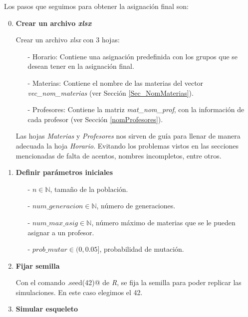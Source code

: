 Los pasos que seguimos para obtener la asignación final son:

\begin{enumerate}
\setcounter{enumi}{-1}
\item \textbf{Crear un archivo \textit{xlsx}} \label{paso_cero}

Crear un archivo \textit{xlsx} con 3 hojas:

\begin{itemize}
\item[-] Horario: Contiene una asignación predefinida con los grupos que se desean tener en la asignación final.

\item[-] Materias: Contiene el nombre de las materias del vector \textit{vec\_nom\_materias} (ver Sección \ref{Sec_NomMaterias}).

\item[-] Profesores: Contiene la matriz \textit{mat\_nom\_prof}, con la información de cada profesor (ver Sección \ref{nomProfesores}).
\end{itemize}

Las hojas \textit{Materias} y \textit{Profesores} nos sirven de guía para llenar de manera adecuada la hoja \textit{Horario}. Evitando los problemas vistos en las secciones mencionadas de falta de acentos, nombres incompletos, entre otros.


\item \textbf{Definir parámetros iniciales}

\begin{itemize}
\item[-] $n \in \mathbb{N}$, tamaño de la población.

\item[-] $num\_generacion \in \mathbb{N}$, número de generaciones.

\item[-] $num\_max\_asig \in \mathbb{N}$, número máximo de materias que se le pueden asignar a un profesor.

\item[-] $prob\_mutar \in (0,0.05]$, probabilidad de mutación.
\end{itemize}

\item \textbf{Fijar semilla}

Con el comando \verb@set.seed(42)@ de \textit{R}, se fija la semilla para poder replicar las simulaciones. En este caso elegimos el 42.

\item \textbf{Simular esqueleto} \label{paso_sim_esq}


\end{enumerate}
